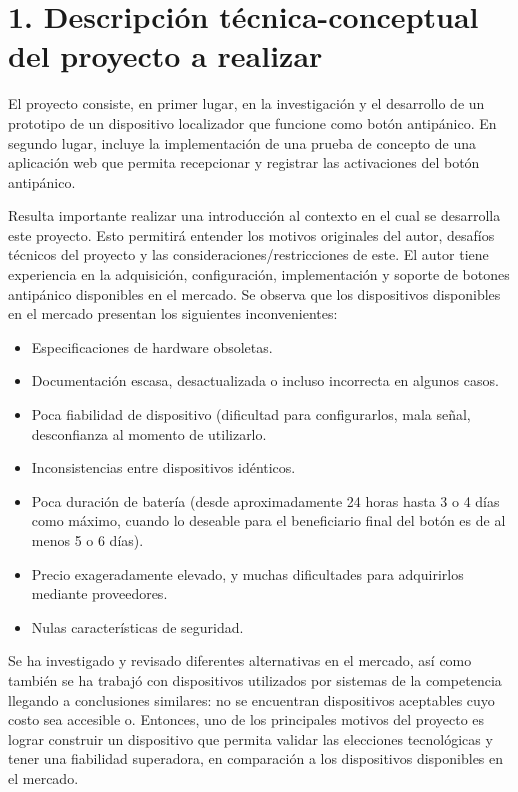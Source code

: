 \documentclass[
11pt, %
]{charter}
\begin{document}
\section{1. Descripción técnica-conceptual del proyecto a realizar}
\label{sec:descripcion}


El proyecto consiste, en primer lugar, en la investigación y el desarrollo de un prototipo de un dispositivo localizador que funcione como botón antipánico. En segundo lugar, incluye la implementación de una prueba de concepto de una aplicación web que permita recepcionar y registrar las activaciones del botón antipánico.

Resulta importante realizar una introducción al contexto en el cual se desarrolla este proyecto. Esto permitirá entender los motivos originales del autor, desafíos técnicos del proyecto y las consideraciones/restricciones de este.
El autor tiene experiencia en la adquisición, configuración, implementación y soporte de botones antipánico disponibles en el mercado. Se observa que los dispositivos disponibles en el mercado presentan los siguientes inconvenientes:
\begin{itemize}
	\item Especificaciones de hardware obsoletas.
	\item Documentación escasa, desactualizada o incluso incorrecta en algunos casos.
	\item Poca fiabilidad de dispositivo (dificultad para configurarlos, mala señal, desconfianza al momento de utilizarlo. 
	\item Inconsistencias entre dispositivos idénticos.
	\item Poca duración de batería (desde aproximadamente 24 horas hasta 3 o 4 días como máximo, cuando lo deseable para el beneficiario final del botón es de al menos 5 o 6 días).
	\item Precio exageradamente elevado, y muchas dificultades para adquirirlos mediante proveedores.
	\item Nulas características de seguridad.
\end{itemize}

Se ha investigado y revisado diferentes alternativas en el mercado, así como también se ha trabajó con dispositivos utilizados por sistemas de la competencia llegando a conclusiones similares: no se encuentran dispositivos aceptables cuyo costo sea accesible o. Entonces, uno de los principales motivos del proyecto es lograr construir un dispositivo que permita validar las elecciones tecnológicas y tener una fiabilidad superadora, en comparación a los dispositivos disponibles en el mercado.
\end{document}
